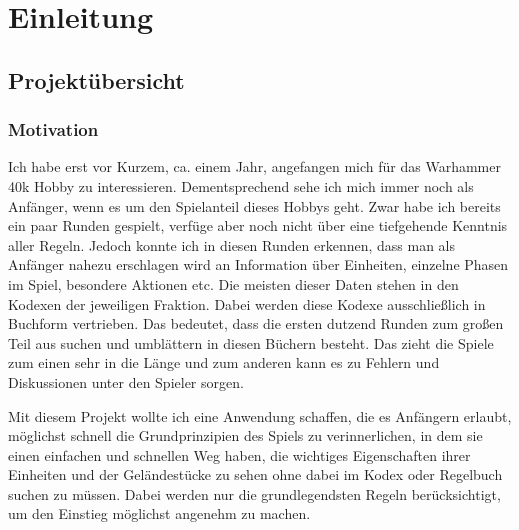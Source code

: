 \setlength{\parindent}{0em}


\chapter{Einleitung} %

\label{Kapitel 1} %


\section{Projektübersicht}

\subsection{Motivation}

Ich habe erst vor Kurzem, ca. einem Jahr, angefangen mich für das Warhammer 40k Hobby zu interessieren. Dementsprechend sehe ich mich immer noch als Anfänger, wenn es um den Spielanteil dieses Hobbys geht. Zwar habe ich bereits ein paar Runden gespielt, verfüge aber noch nicht über eine tiefgehende Kenntnis aller Regeln. Jedoch konnte ich in diesen Runden erkennen, dass man als Anfänger nahezu erschlagen wird an Information über Einheiten, einzelne Phasen im Spiel, besondere Aktionen etc. Die meisten dieser Daten stehen in den Kodexen der jeweiligen Fraktion. Dabei werden diese Kodexe ausschließlich in Buchform vertrieben. Das bedeutet, dass die ersten dutzend Runden zum großen Teil aus suchen und umblättern in diesen Büchern besteht. Das zieht die Spiele zum einen sehr in die Länge und zum anderen kann es zu Fehlern und Diskussionen unter den Spieler sorgen.\newline

Mit diesem Projekt wollte ich eine Anwendung schaffen, die es Anfängern erlaubt, möglichst schnell die Grundprinzipien des Spiels zu verinnerlichen, in dem sie einen einfachen und schnellen Weg haben, die wichtiges Eigenschaften ihrer Einheiten und der Geländestücke zu sehen ohne dabei im Kodex oder Regelbuch suchen zu müssen. Dabei werden nur die grundlegendsten Regeln berücksichtigt, um den Einstieg möglichst angenehm zu machen.


